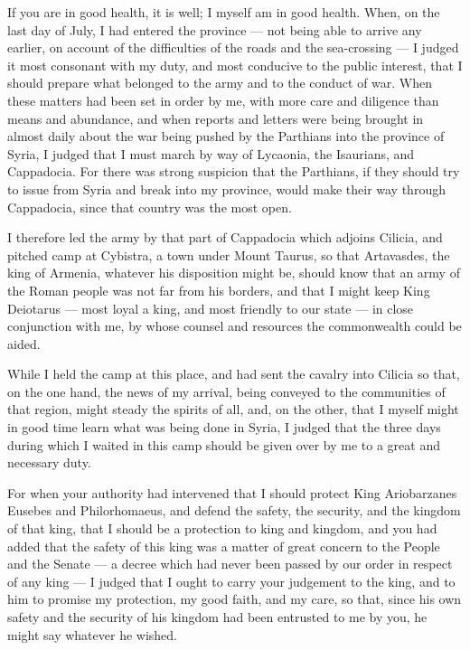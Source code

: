 

 If you are in good health, it is well; I myself am in good health. When, on the last day of July, I had entered the province --- not being able to arrive any earlier, on account of the difficulties of the roads and the sea-crossing --- I judged it most consonant with my duty, and most conducive to the public interest, that I should prepare what belonged to the army and to the conduct of war. When these matters had been set in order by me, with more care and diligence than means and abundance, and when reports and letters were being brought in almost daily about the war being pushed by the Parthians into the province of Syria, I judged that I must march by way of Lycaonia, the Isaurians, and Cappadocia. For there was strong suspicion that the Parthians, if they should try to issue from Syria and break into my province, would make their way through Cappadocia, since that country was the most open.

 I therefore led the army by that part of Cappadocia which adjoins Cilicia, and pitched camp at Cybistra, a town under Mount Taurus, so that Artavasdes, the king of Armenia, whatever his disposition might be, should know that an army of the Roman people was not far from his borders, and that I might keep King Deiotarus --- most loyal a king, and most friendly to our state --- in close conjunction with me, by whose counsel and resources the commonwealth could be aided.

 While I held the camp at this place, and had sent the cavalry into Cilicia so that, on the one hand, the news of my arrival, being conveyed to the communities of that region, might steady the spirits of all, and, on the other, that I myself might in good time learn what was being done in Syria, I judged that the three days during which I waited in this camp should be given over by me to a great and necessary duty.

 For when your authority had intervened that I should protect King Ariobarzanes Eusebes and Philorhomaeus, and defend the safety, the security, and the kingdom of that king, that I should be a protection to king and kingdom, and you had added that the safety of this king was a matter of great concern to the People and the Senate --- a decree which had never been passed by our order in respect of any king --- I judged that I ought to carry your judgement to the king, and to him to promise my protection, my good faith, and my care, so that, since his own safety and the security of his kingdom had been entrusted to me by you, he might say whatever he wished.

